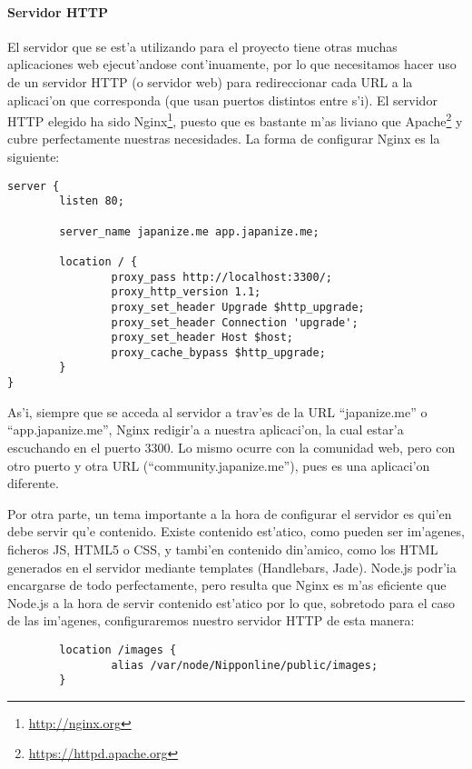 \paragraph{Servidor HTTP}


El servidor que se est'a utilizando para el proyecto tiene otras muchas aplicaciones web ejecut'andose cont'inuamente, por lo que
necesitamos hacer uso de un servidor HTTP (o servidor web) para redireccionar cada URL a la aplicaci'on que corresponda (que usan puertos
distintos entre s'i). El servidor HTTP elegido ha sido Nginx\footnote{\url{http://nginx.org}}, puesto que es bastante m'as liviano que Apache\footnote{\url{https://httpd.apache.org}} y cubre perfectamente nuestras necesidades.
La forma de configurar Nginx es la siguiente:

\begin{verbatim}
server {
        listen 80;

        server_name japanize.me app.japanize.me;

        location / {
                proxy_pass http://localhost:3300/;
                proxy_http_version 1.1;
                proxy_set_header Upgrade $http_upgrade;
                proxy_set_header Connection 'upgrade';
                proxy_set_header Host $host;
                proxy_cache_bypass $http_upgrade;
        }
}
\end{verbatim}

As'i, siempre que se acceda al servidor a trav'es de la URL ``japanize.me'' o ``app.japanize.me'', Nginx redigir'a a nuestra aplicaci'on, la cual estar'a escuchando en el puerto 3300.
Lo mismo ocurre con la comunidad web, pero con otro puerto y otra URL (``community.japanize.me''), pues es una aplicaci'on diferente.

Por otra parte, un tema importante a la hora de configurar el servidor es qui'en debe servir qu'e contenido. Existe contenido est'atico, como pueden ser im'agenes, ficheros JS, HTML5 o CSS,
y tambi'en contenido din'amico, como los HTML generados en el servidor mediante templates (Handlebars, Jade). Node.js podr'ia encargarse de todo perfectamente, pero resulta que
Nginx es m'as eficiente que Node.js a la hora de servir contenido est'atico por lo que, sobretodo para el caso de las im'agenes, configuraremos nuestro servidor HTTP de esta manera:

\begin{verbatim}
        location /images {
                alias /var/node/Nipponline/public/images;
        }
\end{verbatim}

